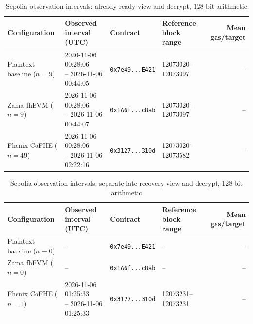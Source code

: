 \begin{table}[!t]
\caption{Sepolia observation intervals: already-ready view and decrypt, 128-bit arithmetic}
\label{tab:sepolia-view-decrypt-classic-euint128-primary}
\centering
\footnotesize
\setlength{\tabcolsep}{4pt}
\begin{tabular}{|l|l|l|l|r|}
\hline
\textbf{Configuration} &
\textbf{Observed interval (UTC)} &
\textbf{Contract} &
\textbf{Reference block range} &
\textbf{Mean gas/target} \\
\hline
Plaintext baseline (\(n=9\)) &
\shortstack[l]{2026-11-06 00:28:06 \\ -- 2026-11-06 00:44:05} &
\texttt{0x7e49...E421} &
12073020--12073097 &
-- \\
\hline
Zama fhEVM (\(n=9\)) &
\shortstack[l]{2026-11-06 00:28:06 \\ -- 2026-11-06 00:44:07} &
\texttt{0x1A6f...c8ab} &
12073020--12073097 &
-- \\
\hline
Fhenix CoFHE (\(n=49\)) &
\shortstack[l]{2026-11-06 00:28:06 \\ -- 2026-11-06 02:22:16} &
\texttt{0x3127...310d} &
12073020--12073582 &
-- \\
\hline
\end{tabular}
\end{table}

\begin{table}[!t]
\caption{Sepolia observation intervals: separate late-recovery view and decrypt, 128-bit arithmetic}
\label{tab:sepolia-view-decrypt-classic-euint128-late-recovery}
\centering
\footnotesize
\setlength{\tabcolsep}{4pt}
\begin{tabular}{|l|l|l|l|r|}
\hline
\textbf{Configuration} &
\textbf{Observed interval (UTC)} &
\textbf{Contract} &
\textbf{Reference block range} &
\textbf{Mean gas/target} \\
\hline
Plaintext baseline (\(n=0\)) &
-- &
\texttt{0x7e49...E421} &
-- &
-- \\
\hline
Zama fhEVM (\(n=0\)) &
-- &
\texttt{0x1A6f...c8ab} &
-- &
-- \\
\hline
Fhenix CoFHE (\(n=1\)) &
\shortstack[l]{2026-11-06 01:25:33 \\ -- 2026-11-06 01:25:33} &
\texttt{0x3127...310d} &
12073231--12073231 &
-- \\
\hline
\end{tabular}
\end{table}


